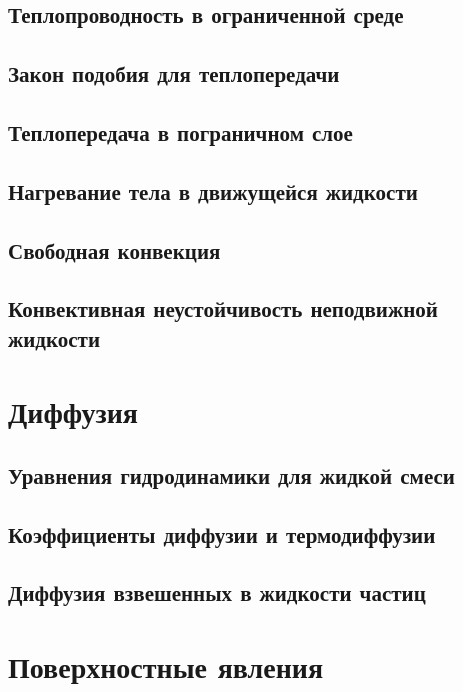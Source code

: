 \documentclass[12pt,a4paper]{book}
\begin{document}
\section{Теплопроводность в ограниченной среде}\label{sec:p52}
\section{Закон подобия для теплопередачи}\label{sec:p53}
\section{Теплопередача в пограничном слое}\label{sec:p54}
\section{Нагревание тела в движущейся жидкости}\label{sec:p55}
\section{Свободная конвекция}\label{sec:p56}
\section{Конвективная неустойчивость неподвижной жидкости}\label{sec:p57}

\chapter{Диффузия}
\section{Уравнения гидродинамики для жидкой смеси}
\section{Коэффициенты диффузии и термодиффузии}
\section{Диффузия взвешенных в жидкости частиц}

\chapter{Поверхностные явления}
\end{document}
